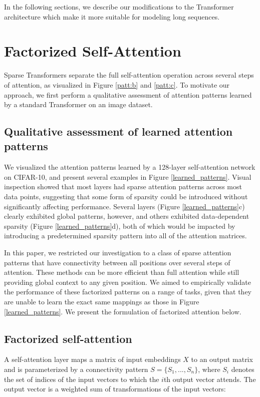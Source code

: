 In the following sections, we describe our modifications to the Transformer architecture which make it more suitable for modeling long sequences.

\section{Factorized Self-Attention}

Sparse Transformers separate the full self-attention operation across several steps of attention, as visualized in Figure \ref{patt:b} and \ref{patt:c}. To motivate our approach, we first perform a qualitative assessment of attention patterns learned by a standard Transformer on an image dataset.

\subsection{Qualitative assessment of learned attention patterns} We visualized the attention patterns learned by a 128-layer self-attention network on CIFAR-10, and present several examples in Figure \ref{learned_patterns}. Visual inspection showed that most layers had sparse attention patterns across most data points, suggesting that some form of sparsity could be introduced without significantly affecting performance. Several layers (Figure \ref{learned_patterns}c) clearly exhibited global patterns, however, and others exhibited data-dependent sparsity (Figure \ref{learned_patterns}d), both of which would be impacted by introducing a predetermined sparsity pattern into all of the attention matrices.

In this paper, we restricted our investigation to a class of sparse attention patterns that have connectivity between all positions over several steps of attention. These methods can be more efficient than full attention while still providing global context to any given position. We aimed to empirically validate the performance of these factorized patterns on a range of tasks, given that they are unable to learn the exact same mappings as those in Figure \ref{learned_patterns}. We present the formulation of factorized attention below.

\subsection{Factorized self-attention} A self-attention layer maps a matrix of input embeddings $X$ to an output matrix and is parameterized by a connectivity pattern $S = \{S_1, ..., S_n\}$, where $S_i$ denotes the set of indices of the input vectors to which the $i$th output vector attends. The output vector is a weighted sum of transformations of the input vectors:

